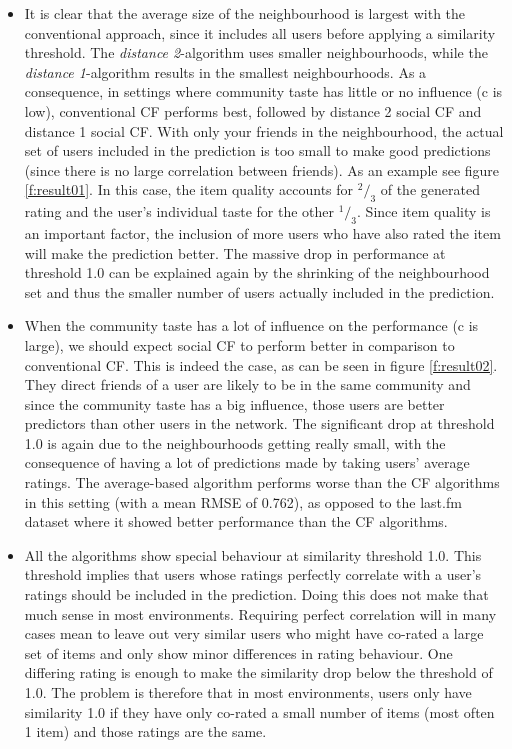\begin{itemize}
\item It is clear that the average size of the neighbourhood is largest with the conventional approach, since it includes all users before applying a similarity threshold. The \textit{distance 2}-algorithm uses smaller neighbourhoods, while the \textit{distance 1}-algorithm results in the smallest neighbourhoods. As a consequence, in settings where community taste has little or no influence (c is low), conventional CF performs best, followed by distance 2 social CF and distance 1 social CF. With only your friends in the neighbourhood, the actual set of users included in the prediction is too small to make good predictions (since there is no large correlation between friends). As an example see figure \ref{f:result01}. In this case, the item quality accounts for $^2 / _3$ of the generated rating and the user's individual taste for the other $^1 / _3$. Since item quality is an important factor, the inclusion of more users who have also rated the item will make the prediction better. The massive drop in performance at threshold 1.0 can be explained again by the shrinking of the neighbourhood set and thus the smaller number of users actually included in the prediction.
\item When the community taste has a lot of influence on the performance (c is large), we should expect social CF to perform better in comparison to conventional CF. This is indeed the case, as can be seen in figure \ref{f:result02}. They direct friends of a user are likely to be in the same community and since the community taste has a big influence, those users are better predictors than other users in the network. The significant drop at threshold 1.0 is again due to the neighbourhoods getting really small, with the consequence of having a lot of predictions made by taking users' average ratings. The average-based algorithm performs worse than the CF algorithms in this setting (with a mean RMSE of 0.762), as opposed to the last.fm dataset where it showed better performance than the CF algorithms.
\item All the algorithms show special behaviour at similarity threshold 1.0. This threshold implies that users whose ratings perfectly correlate with a user's ratings should be included in the prediction. Doing this does not make that much sense in most environments. Requiring perfect correlation will in many cases mean to leave out very similar users who might have co-rated a large set of items and only show minor differences in rating behaviour. One differing rating is enough to make the similarity drop below the threshold of 1.0. The problem is therefore that in most environments, users only have similarity 1.0 if they have only co-rated a small number of items (most often 1 item) and those ratings are the same.
\end{itemize}

